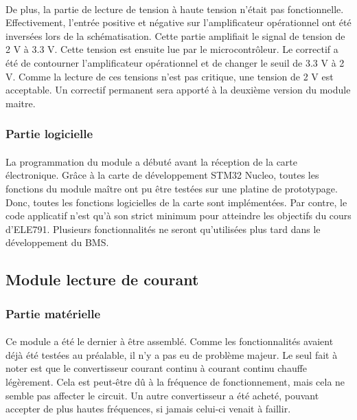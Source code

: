 			\paragraph{}
			De plus, la partie de lecture de tension à haute tension n’était pas fonctionnelle. Effectivement, l’entrée positive et négative sur l'amplificateur opérationnel ont été inversées lors de la schématisation. Cette partie amplifiait le signal de tension de 2 V à 3.3 V. Cette tension est ensuite lue par le microcontrôleur. Le correctif a été de contourner l’amplificateur opérationnel et de changer le seuil de 3.3 V à 2 V. Comme la lecture de ces tensions n’est pas critique, une tension de 2 V est acceptable. Un correctif permanent sera apporté à la deuxième version du module maitre.

		\subsubsection{Partie logicielle}

			\paragraph{}
			La programmation du module a débuté avant la réception de la carte électronique. Grâce à la carte de développement STM32 Nucleo, toutes les fonctions du module maître ont pu être testées sur une platine de prototypage. Donc, toutes les fonctions logicielles de la carte sont implémentées. Par contre, le code applicatif n’est qu’à son strict minimum pour atteindre les objectifs du cours d’ELE791. Plusieurs fonctionnalités ne seront qu’utilisées plus tard dans le développement du BMS.

	\subsection{Module lecture de courant}

		\subsubsection{Partie matérielle}

			\paragraph{}
			Ce module a été le dernier à être assemblé. Comme les fonctionnalités avaient déjà été testées au préalable, il n’y a pas eu de problème majeur. Le seul fait à noter est que le convertisseur courant continu à courant continu chauffe légèrement. Cela est peut-être dû à la fréquence de fonctionnement, mais cela ne semble pas affecter le circuit. Un autre convertisseur a été acheté, pouvant accepter de plus hautes fréquences, si jamais celui-ci venait à faillir.

